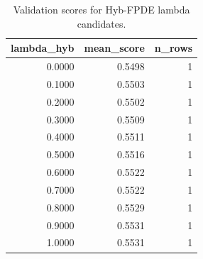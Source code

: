 \begin{table}[t]
\caption{Validation scores for Hyb-FPDE lambda candidates.}
\label{tab:lambda_distribution_computed}
\centering
\begin{tabular}{rrr}
\toprule
lambda\_hyb & mean\_score & n\_rows \\
\midrule
0.0000 & 0.5498 & 1 \\
0.1000 & 0.5503 & 1 \\
0.2000 & 0.5502 & 1 \\
0.3000 & 0.5509 & 1 \\
0.4000 & 0.5511 & 1 \\
0.5000 & 0.5516 & 1 \\
0.6000 & 0.5522 & 1 \\
0.7000 & 0.5522 & 1 \\
0.8000 & 0.5529 & 1 \\
0.9000 & 0.5531 & 1 \\
1.0000 & 0.5531 & 1 \\
\bottomrule
\end{tabular}

\end{table}
